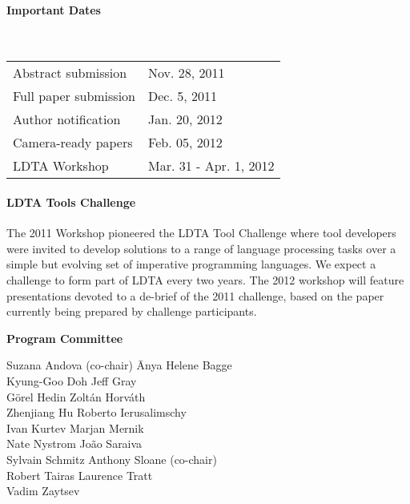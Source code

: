 \documentclass[letterpaper, twocolumn, 9pt]{article}
\begin{document}
\paragraph{\textsf{Important Dates}} ~

\vspace{5pt}
\hspace{-0.20in}
\begin{tabular}{ll}
Abstract submission & Nov. 28, 2011\\
Full paper submission & Dec. 5, 2011\\
Author notification & Jan. 20, 2012\\
Camera-ready papers & Feb. 05, 2012\\
LDTA Workshop & Mar. 31 - Apr. 1, 2012
\end{tabular}

\paragraph{\textsf{LDTA Tools Challenge}}
The 2011 Workshop pioneered the LDTA Tool Challenge where tool
developers were invited to develop solutions to a range of language
processing tasks over a simple but evolving set of imperative
programming languages. We expect a challenge to form part of LDTA
every two years. The 2012 workshop will feature presentations devoted
to a de-brief of the 2011 challenge, based on the paper currently
being prepared by challenge participants.

\newpage

\vspace{3pt}
\hspace{-0.20in}
{\bfseries\textsf{Program Committee}}\\
{\small
\vspace{-9pt}
\begin{tabbing}
 Suzana Andova (co-chair) \hspace{1.25cm}\= Anya Helene Bagge\\
 Kyung-Goo Doh \> Jeff Gray\\
 Görel Hedin \> Zoltán Horváth\\
 Zhenjiang Hu \> Roberto Ierusalimschy\\
 Ivan Kurtev \> Marjan Mernik \\
 Nate Nystrom \> João Saraiva\\
 Sylvain Schmitz \> Anthony Sloane (co-chair)\\
 Robert Tairas \> Laurence Tratt\\
 Vadim Zaytsev \\
\end{tabbing}
}
\end{document}
